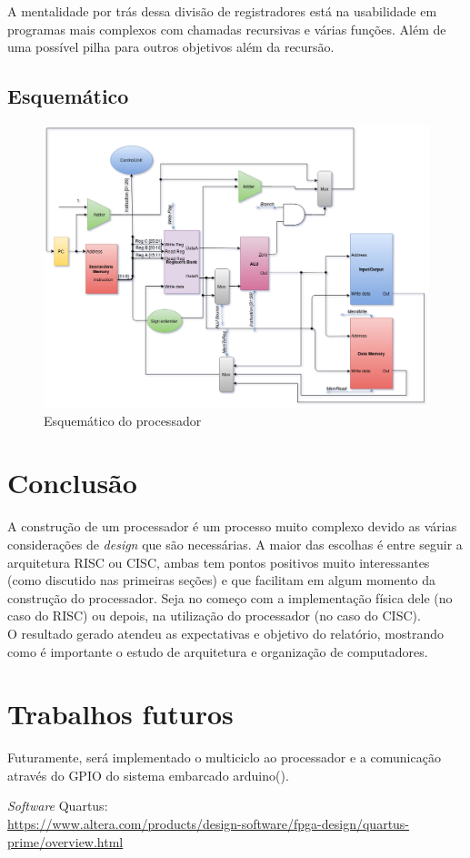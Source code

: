 \documentclass[a4paper, 12pt]{article}
\begin{document}
A mentalidade por trás dessa divisão de registradores está na usabilidade em programas mais complexos com chamadas recursivas e várias funções. Além de uma possível pilha para outros objetivos além da recursão.

\subsection{Esquemático}
\begin{figure}
	\includegraphics[scale=0.5]{LABAOC.png}
	\caption{Esquemático do processador}
\end{figure}
\newpage

\section{Conclusão}
A construção de um processador é um processo muito complexo devido as várias considerações de \textit{design} que são necessárias. A maior das escolhas é entre seguir a arquitetura RISC ou CISC, ambas tem pontos positivos muito interessantes (como discutido nas primeiras seções) e que facilitam em algum momento da construção do processador. Seja no começo com a implementação física dele (no caso do RISC) ou depois, na utilização do processador (no caso do CISC).\\
O resultado gerado atendeu as expectativas e objetivo do relatório, mostrando como é importante o estudo de arquitetura e organização de computadores.

\section{Trabalhos futuros}
Futuramente, será implementado o multiciclo ao processador e a comunicação através do GPIO do sistema embarcado arduino(\cite{arduino}).

\begin{thebibliography}{9}

  \textit{Software} Quartus:\\
  \url{https://www.altera.com/products/design-software/fpga-design/quartus-prime/overview.html}

\end{thebibliography}
\end{document}
